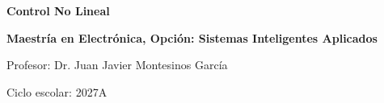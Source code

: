 \begin{titlepage}
  \centering
  \vspace*{2.5cm}

  \vspace{0.7cm}
  {\Huge\bfseries Control No Lineal\par}
  \vspace{1cm}
  {\Large \textbf{Maestría en Electrónica, Opción: Sistemas Inteligentes Aplicados}\par}

  \vfill

  {\large Profesor: Dr. Juan Javier Montesinos García\par}
  \vspace{0.8cm}
  {\large Ciclo escolar: 2027A\par}

  \vfill
\end{titlepage}
